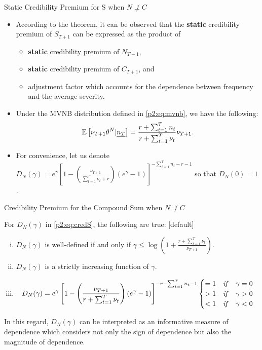 \documentclass[ignorenonframetext,]{beamer}
\begin{document}
\begin{frame}{Static Credibility Premium for S when $N \not\perp C$}
\begin{itemize}
	\item According to the theorem, it can be observed that the \textbf{static} credibility premium of $S_{T+1}$ can be expressed as the product of
	\begin{itemize}
		\item {\color{purple}\textbf{static} credibility premium of $N_{T+1}$,}
		\item {\color{purple}\textbf{static} credibility premium of $C_{T+1}$,} and
		\item {\color{purple}adjustment factor which accounts for the dependence between frequency and the average severity.}
	\end{itemize}
	\item Under the MVNB distribution defined in \eqref{p2:eq:mvnb}, we have the following:
	$$
	{\mathbb E}\left[\nu_{T+1}\theta^N|\underline{n_T}\right] = \frac{r+\sum_{t=1}^T n_t}{r+\sum_{t=1}^T \nu_t}\nu_{T+1}.
	$$
	\item For convenience, let us denote \\
	$D_N(\gamma) = e^\gamma\left[1-\left(\frac{\nu_{T+1}}{\sum_{t=1}^T \nu_t + r}\right)(e^\gamma - 1)\right]^{-\sum_{t=1}^T n_t - r - 1}$ so that $D_N(0)=1$.
\end{itemize}
\end{frame}

\begin{frame}{Credibility Premium for the Compound Sum when $N \not\perp C$}
\begin{theorem}
For $D_N(\gamma)$ in \eqref{p2:eq:credS}, the following are true:
[default]
\begin{enumerate}[(i)]
	\item $D_N(\gamma)$ is well-defined if and only if $\gamma \leq \log\left(1+\frac{r+\sum_{t=1}^T \nu_t}{\nu_{T+1}}\right)$.
	\item $D_N(\gamma)$ is a strictly increasing function of $\gamma$.
	\item
	\small
	$$
	D_N(\gamma) = e^\gamma\left[1-\left(\frac{\nu_{T+1}}{r+\sum_{t=1}^T \nu_t}\right)(e^\gamma - 1)\right]^{-r-\sum_{t=1}^T n_t - 1}
	\begin{cases}
		=1 & \text{\emph{if}} \quad \gamma = 0 \\
		>1 & \text{\emph{if}} \quad \gamma > 0 \\
		<1 & \text{\emph{if}} \quad \gamma < 0
	\end{cases}
	$$
\end{enumerate}
\end{theorem}
In this regard, $D_N(\gamma)$ can be interpreted as an {\color{purple} informative measure of dependence} which considers not only the sign of dependence but also the magnitude of dependence.
\end{frame}
\end{document}
